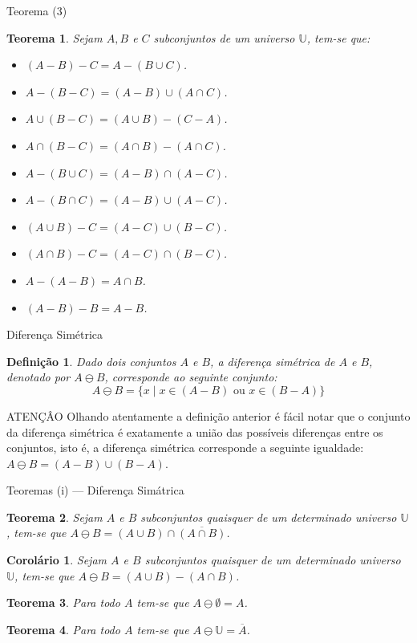 \documentclass[aspectratio=169]{beamer}
\newtheorem{defi}{Definição}
\newtheorem{teo}{Teorema}
\newtheorem{col}{Corolário}
\begin{document}
	\begin{frame}{Teorema (3)}
		\begin{teo}
			Sejam $A, B$ e $C$ subconjuntos de um universo $\mathbb{U}$, tem-se que:
			\begin{itemize}
				\item[a.] $(A - B) - C = A - (B \cup C)$.
				\item[b.] $A - (B - C) = (A - B) \cup (A \cap C)$.
				\item[c.] $A \cup (B - C) = (A \cup B) - (C - A)$.
				\item[d.] $A \cap (B - C) = (A \cap B) - (A \cap C)$.
				\item[e.] $A - (B \cup C) = (A - B) \cap (A - C)$.
				\item[f.] $A - (B \cap C) = (A - B) \cup (A - C)$.
				\item[g.] $(A \cup B) - C = (A - C) \cup (B - C)$.
				\item[h.] $(A \cap B) - C = (A - C) \cap (B - C)$.
				\item[i.] $A - (A - B) = A \cap B$.
				\item[j.] $(A - B) - B = A - B$.
			\end{itemize}
		\end{teo}
	\end{frame}
	
	\begin{frame}{Diferença Simétrica}
		\begin{defi}\label{def:DiferencaSimetricaConjuntos}
			Dado dois conjuntos $A$ e $B$, a diferença simétrica de $A$ e $B$, denotado por $A \ominus B$, corresponde ao seguinte conjunto:
			$$A \ominus B = \{x \mid x \in (A - B) \mbox{ ou } x \in (B - A)\}$$
		\end{defi}
		\pause
		\begin{alertblock}{ATENÇÂO}
			Olhando atentamente a definição anterior é fácil notar que o conjunto da diferença simétrica é exatamente a união das possíveis diferenças entre os conjuntos, isto é, a diferença simétrica corresponde a seguinte igualdade: $A \ominus B = (A - B) \cup (B - A)$.
		\end{alertblock}
	\end{frame}

	\begin{frame}{Teoremas (i) --- Diferença Simátrica}
		\begin{teo}
			Sejam $A$ e $B$ subconjuntos quaisquer de um determinado universo $\mathbb{U}$, tem-se que $A \ominus B = (A \cup B) \cap \overline{(A \cap B)}$.
		\end{teo}
		\pause
		\begin{col}
			Sejam $A$ e $B$ subconjuntos quaisquer de um determinado universo $\mathbb{U}$, tem-se que $A \ominus B = (A \cup B) - (A \cap B)$.
		\end{col}
		\pause
		\begin{teo}
			Para todo $A$ tem-se que $A \ominus \emptyset = A$.
		\end{teo}
		\begin{teo}
			Para todo $A$ tem-se que $A \ominus \mathbb{U} = \overline{A}$.
		\end{teo}
	\end{frame}
\end{document}
